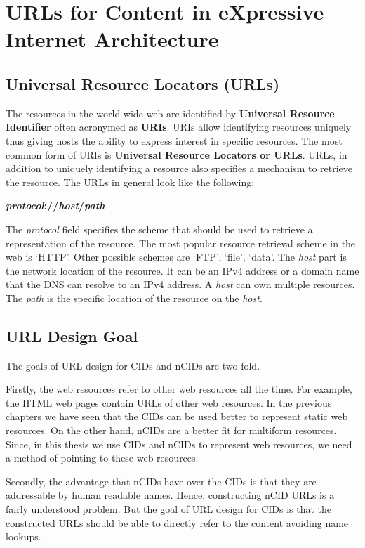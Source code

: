 \chapter{URLs for Content in eXpressive Internet Architecture}
\label{sec:urls}

\section{Universal Resource Locators (URLs)}
The resources in the world wide web are identified by
\textbf{Universal Resource Identifier} often acronymed as
\textbf{URIs}. URIs allow identifying resources uniquely thus giving
hosts the ability to express interest in specific resources. The most
common form of URIs is \textbf{Universal Resource Locators or
  URLs}. URLs, in addition to uniquely identifying a resource also
specifies a mechanism to retrieve the resource. The URLs in general
look like the following:

\begin{center}
  \textbf{\textit{protocol}://\textit{host}/\textit{path}}
\end{center}

The \textit{protocol} field specifies the scheme that should be used
to retrieve a representation of the resource. The most popular
resource retrieval scheme in the web is `HTTP'. Other possible schemes
are `FTP', `file', `data'. The \textit{host} part is the network
location of the resource. It can be an IPv4 address or a domain name
that the DNS can resolve to an IPv4 address. A \textit{host} can own
multiple resources. The \textit{path} is the specific location of the
resource on the \textit{host}.

\section{URL Design Goal}
The goals of URL design for CIDs and nCIDs are two-fold.

Firstly, the web resources refer to other web resources all the
time. For example, the HTML web pages contain URLs of other web
resources. In the previous chapters we have seen that the CIDs can be
used better to represent static web resources. On the other hand,
nCIDs are a better fit for multiform resources. Since, in this thesis
we use CIDs and nCIDs to represent web resources, we need a method of
pointing to these web resources.

Secondly, the advantage that nCIDs have over the CIDs is that they are
addressable by human readable names. Hence, constructing nCID URLs is
a fairly understood problem. But the goal of URL design for CIDs is
that the constructed URLs should be able to directly refer to the
content avoiding name lookups.


